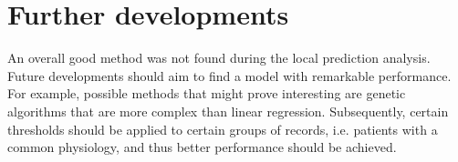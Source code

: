 \section{Further developments}
An overall good method was not found during the local prediction analysis. Future developments should aim to find a model with remarkable performance. For example, possible methods that might prove interesting are genetic algorithms that are more complex than linear regression. Subsequently, certain thresholds should be applied to certain groups of records, i.e. patients with a common physiology, and thus better performance should be achieved. 